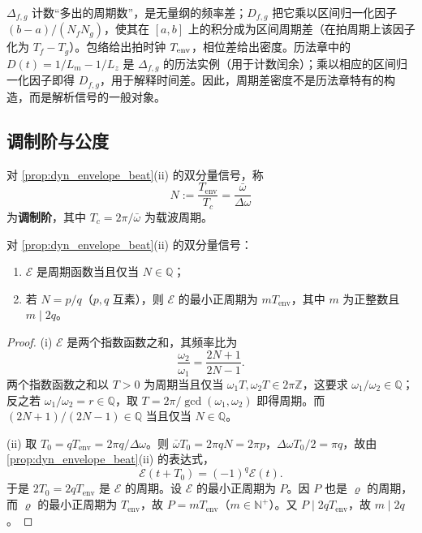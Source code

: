 \begin{remark}[两种密度的分工]
\label{rem:dyn_two_densities}
\(\Delta_{f,g}\) 计数“多出的周期数”，是无量纲的频率差；\(D_{f,g}\) 把它乘以区间归一化因子 \((b-a)/(N_fN_g)\)，使其在 \([a,b]\) 上的积分成为区间周期差（在拍周期上该因子化为 \(T_f-T_g\)）。包络给出拍时钟 \(T_{\rm env}\)，相位差给出密度。历法章中的 \(D(t)=1/L_m-1/L_z\) 是 \(\Delta_{f,g}\) 的历法实例（用于计数闰余）；乘以相应的区间归一化因子即得 \(D_{f,g}\)，用于解释时间差。因此，周期差密度不是历法章特有的构造，而是解析信号的一般对象。
\end{remark}

\subsection{调制阶与公度}

\begin{definition}[调制阶]\label{def:dyn_modulation_order}
对 \cref{prop:dyn_envelope_beat}(ii) 的双分量信号，称
\[
N:=\frac{T_{\text{env}}}{T_c}=\frac{\bar\omega}{\Delta\omega}
\]
为\textbf{调制阶}，其中 $T_c=2\pi/\bar\omega$ 为载波周期。
\end{definition}

\begin{proposition}[调制阶与公度]\label{prop:dyn_modulation_order}
对 \cref{prop:dyn_envelope_beat}(ii) 的双分量信号：
\begin{enumerate}[label=(\roman*)]
    \item $\mathcal E$ 是周期函数当且仅当 $N\in\mathbb Q$；
    \item 若 $N=p/q$（$p,q$ 互素），则 $\mathcal E$ 的最小正周期为 $mT_{\text{env}}$，其中 $m$ 为正整数且 $m\mid 2q$。
\end{enumerate}
\end{proposition}

\begin{proof}
(i) $\mathcal E$ 是两个指数函数之和，其频率比为
\[
\frac{\omega_2}{\omega_1}=\frac{2N+1}{2N-1}.
\]
两个指数函数之和以 $T>0$ 为周期当且仅当 $\omega_1T,\omega_2T\in2\pi\mathbb Z$，这要求 $\omega_1/\omega_2\in\mathbb Q$；反之若 $\omega_1/\omega_2=r\in\mathbb Q$，取 $T=2\pi/\gcd(\omega_1,\omega_2)$ 即得周期。而 $(2N+1)/(2N-1)\in\mathbb Q$ 当且仅当 $N\in\mathbb Q$。

(ii) 取 $T_0=qT_{\text{env}}=2\pi q/\Delta\omega$。则 $\bar\omega T_0=2\pi qN=2\pi p$，$\Delta\omega T_0/2=\pi q$，故由 \cref{prop:dyn_envelope_beat}(ii) 的表达式，
\[
\mathcal E(t+T_0)=(-1)^q\mathcal E(t).
\]
于是 $2T_0=2qT_{\text{env}}$ 是 $\mathcal E$ 的周期。设 $\mathcal E$ 的最小正周期为 $P$。因 $P$ 也是 $\varrho$ 的周期，而 $\varrho$ 的最小正周期为 $T_{\text{env}}$，故 $P=mT_{\text{env}}$（$m\in\mathbb N^+$）。又 $P\mid 2qT_{\text{env}}$，故 $m\mid 2q$。
\end{proof}

